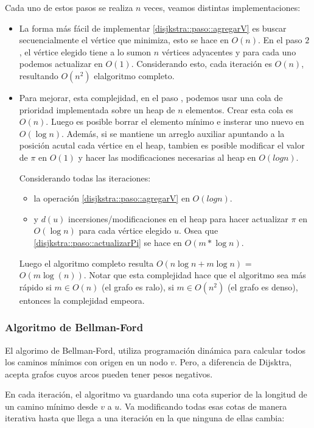 Cada uno de estos pasos se realiza \(n\) veces, veamos distintas implementaciones:

\begin{itemize}
  \item La forma más fácil de implementar \ref{disjkstra::paso::agregarV} es buscar secuencialmente el vértice que minimiza, esto se hace en \(O(n)\). En el paso \(2\), el vértice elegido tiene a lo sumon \(n\) vértices adyacentes y para cada uno podemos actualizar en \(O(1)\). Considerando esto, cada iteración es \(O(n)\), resultando \(O(n^2)\) elalgoritmo completo.
  \item Para mejorar, esta complejidad, en el paso \label{dijsktra::paso::agregarV}, podemos usar una cola de prioridad implementada sobre un heap de \(n\) elementos. Crear esta cola es \(O(n)\). Luego es posible borrar el elemento mínimo e insterar uno nuevo en \(O(\log{n})\). Además, si se mantiene un arreglo auxiliar apuntando a la posición acutal cada vértice en el heap, tambien es posible modificar el valor de \(\pi\) en \(O(1)\) y hacer las modificaciones necesarias al heap en \(O(log n)\).

        Considerando todas las iteraciones:
        \begin{itemize}
          \item la operación \ref{disjkstra::paso::agregarV} en \(O(log n)\).
          \item y \(d(u)\) incersiones/modificaciones en el heap para hacer actualizar \(\pi\) en \(O(\log{n})\) para cada vértice elegido \(u\). Osea que \ref{disjkstra::paso::actualizarPi} se hace en \(O(m*\log{n})\).
        \end{itemize}

        Luego el algoritmo completo resulta \(O(n\log{n} + m\log{n})\) = \(O(m\log(n))\). Notar que esta complejidad hace que el algoritmo sea más rápido si \(m\in O(n)\) (el grafo es ralo), si \(m\in O(n^2)\) (el grafo es denso), entonces la complejidad empeora.
\end{itemize}

\subsubsection{Algoritmo de Bellman-Ford}
El algorimo de Bellman-Ford, utiliza programación dinámica para calcular todos los caminos mínimos con origen en un nodo \(v\). Pero, a diferencia de Dijsktra, acepta grafos cuyos arcos pueden tener pesos negativos.

En cada iteración, el algoritmo va guardando una cota superior de la longitud de un camino mínimo desde \(v\) a \(u\). Va modificando todas esas cotas de manera iterativa hasta que llega a una iteración en la que ninguna de ellas cambia:

